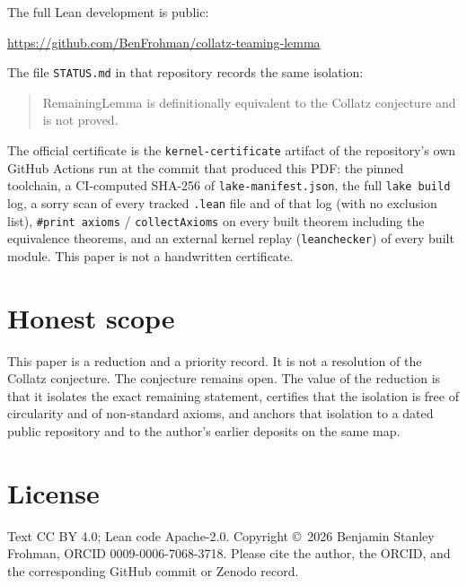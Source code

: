 \documentclass[11pt]{article}
\begin{document}
The full Lean development is public:
\begin{center}
\url{https://github.com/BenFrohman/collatz-teaming-lemma}
\end{center}
The file \texttt{STATUS.md} in that repository records the same isolation:
\begin{quote}
RemainingLemma is definitionally equivalent to the Collatz conjecture and is not proved.
\end{quote}
The official certificate is the \texttt{kernel-certificate} artifact of the repository's own GitHub Actions run at the commit that produced this PDF: the pinned toolchain, a CI-computed SHA-256 of \texttt{lake-manifest.json}, the full \texttt{lake build} log, a sorry scan of every tracked \texttt{.lean} file and of that log (with no exclusion list), \texttt{\#print axioms} / \texttt{collectAxioms} on every built theorem including the equivalence theorems, and an external kernel replay (\texttt{leanchecker}) of every built module. This paper is not a handwritten certificate.

\section{Honest scope}

This paper is a reduction and a priority record. It is not a resolution of the Collatz conjecture. The conjecture remains open. The value of the reduction is that it isolates the exact remaining statement, certifies that the isolation is free of circularity and of non-standard axioms, and anchors that isolation to a dated public repository and to the author's earlier deposits on the same map.

\section*{License}
Text CC BY 4.0; Lean code Apache-2.0.
Copyright \copyright\ 2026 Benjamin Stanley Frohman, ORCID 0009-0006-7068-3718.
Please cite the author, the ORCID, and the corresponding GitHub commit or Zenodo record.
\end{document}
